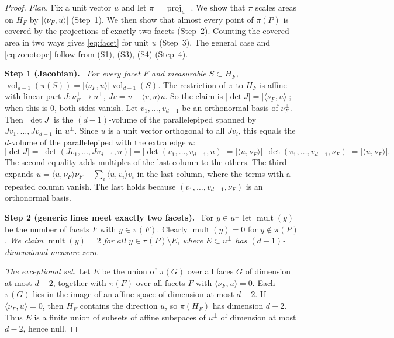 \documentclass[11pt]{article}
\DeclareMathOperator{\vol}{vol}
\DeclareMathOperator{\proj}{proj}
\DeclareMathOperator{\mult}{mult}
\newcommand{\step}[1]{\par\smallskip\noindent\textbf{#1}\ }
\begin{document}
\begin{proof}
\emph{Plan.} Fix a unit vector \(u\) and let \(\pi=\proj_{u^\perp}\). We
show that \(\pi\) scales areas on \(H_F\) by \(|\langle\nu_F,u\rangle|\)
(Step~1). We then show that almost every point of \(\pi(P)\) is covered by
the projections of exactly two facets (Step~2). Counting the covered area
in two ways gives \eqref{eq:facet} for unit \(u\) (Step~3). The general
case and \eqref{eq:zonotope} follow from (S1), (S3), (S4) (Step~4).

\step{Step 1 (Jacobian).} \emph{For every facet \(F\) and measurable
\(S\subset H_F\),
\(\vol_{d-1}(\pi(S))=|\langle\nu_F,u\rangle|\vol_{d-1}(S)\).}
The restriction of \(\pi\) to \(H_F\) is affine with linear part
\(J\colon\nu_F^\perp\to u^\perp\), \(Jv=v-\langle v,u\rangle u\). So the
claim is \(|\det J|=|\langle\nu_F,u\rangle|\); when this is \(0\), both
sides vanish. Let \(v_1,\dots,v_{d-1}\) be an orthonormal basis of
\(\nu_F^\perp\). Then \(|\det J|\) is the \((d-1)\)-volume of the
parallelepiped spanned by \(Jv_1,\dots,Jv_{d-1}\) in \(u^\perp\). Since
\(u\) is a unit vector orthogonal to all \(Jv_i\), this equals the
\(d\)-volume of the parallelepiped with the extra edge \(u\):
\[
 |\det J|=|\det(Jv_1,\dots,Jv_{d-1},u)|
 =|\det(v_1,\dots,v_{d-1},u)|
 =|\langle u,\nu_F\rangle|\,|\det(v_1,\dots,v_{d-1},\nu_F)|
 =|\langle u,\nu_F\rangle|.
\]
The second equality adds multiples of the last column to the others. The
third expands
\(u=\langle u,\nu_F\rangle\nu_F+\sum_i\langle u,v_i\rangle v_i\) in the
last column, where the terms with a repeated column vanish. The last holds
because \((v_1,\dots,v_{d-1},\nu_F)\) is an orthonormal basis.

\step{Step 2 (generic lines meet exactly two facets).} For
\(y\in u^\perp\) let \(\mult(y)\) be the number of facets \(F\) with
\(y\in\pi(F)\). Clearly \(\mult(y)=0\) for \(y\notin\pi(P)\). \emph{We
claim \(\mult(y)=2\) for all \(y\in\pi(P)\setminus E\), where
\(E\subset u^\perp\) has \((d-1)\)-dimensional measure zero.}

\emph{The exceptional set.} Let \(E\) be the union of \(\pi(G)\) over all
faces \(G\) of dimension at most \(d-2\), together with \(\pi(F)\) over all
facets \(F\) with \(\langle\nu_F,u\rangle=0\). Each \(\pi(G)\) lies in the
image of an affine space of dimension at most \(d-2\). If
\(\langle\nu_F,u\rangle=0\), then \(H_F\) contains the direction \(u\), so
\(\pi(H_F)\) has dimension \(d-2\). Thus \(E\) is a finite union of subsets
of affine subspaces of \(u^\perp\) of dimension at most \(d-2\), hence
null.


\end{proof}
\end{document}

